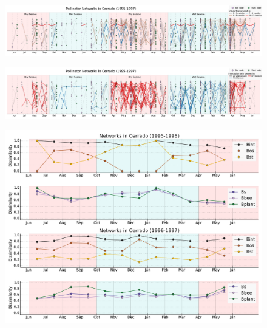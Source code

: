 \documentclass[11pt]{article}
\begin{document}
\newpage
\begin{landscape}

\begin{figure}[H]
  \centering
    \includegraphics[width=260mm]{network(old).pdf}
\end{figure}

\begin{figure}[H]
  \centering
    \includegraphics[width=260mm]{seasonalnetwork(old).pdf}
\end{figure}

\begin{figure}[H]
  \centering
    \includegraphics[width=250mm]{TurnoversAcrossTime(old).pdf}
\end{figure}


\end{landscape}
\end{document}

